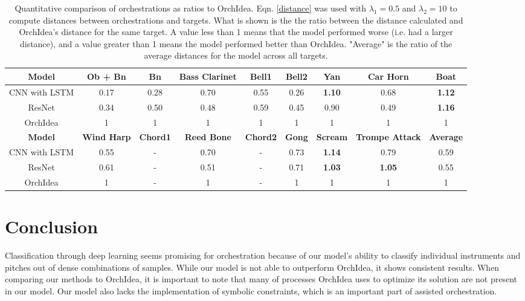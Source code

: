 \documentclass{article}
\begin{document}
\begin{table}
  \begin{center}
    \label{orch_eval}
    \begin{tabular}{|c|c|c|c|c|c|c|c|c|} 
    	  \hline
      \textbf{Model} & \textbf{Ob + Bn} & \textbf{Bn} & \textbf{Bass Clarinet} & \textbf{Bell1} & \textbf{Bell2} & \textbf{Yan} & \textbf{Car Horn} & \textbf{Boat}  \\
      \hline
      CNN with LSTM & 0.17 & 0.28 & 0.70 & 0.55 & 0.26 & \textbf{1.10} & 0.68 & \textbf{1.12} \\
      \hline
      ResNet & 0.34 & 0.50 & 0.48 & 0.59 & 0.45 & 0.90 & 0.49 & \textbf{1.16} \\
      \hline
      OrchIdea & 1 & 1 & 1 & 1 & 1 & 1 & 1 & 1 \\
      \hline
      \hline
      \textbf{Model} & \textbf{Wind Harp} & \textbf{Chord1} & \textbf{Reed Bone} & \textbf{Chord2} & \textbf{Gong} & \textbf{Scream} & \textbf{Trompe Attack} & \textbf{Average}  \\
      \hline
      CNN with LSTM & 0.55 & - & 0.70 & - & 0.73 & \textbf{1.14} & 0.79 & 0.59\\
      \hline
      ResNet & 0.61 & - & 0.51 & - & 0.71 & \textbf{1.03} & \textbf{1.05} & 0.55 \\
      \hline
      OrchIdea & 1 & - & 1 & - & 1 & 1 & 1 & 1 \\
      \hline
    \end{tabular}
  \end{center}
  \caption{Quantitative comparison of orchestrations as ratios to OrchIdea. Eqn. \eqref{distance} was used with $\lambda_1 = 0.5$ and $\lambda_2 = 10$ to compute distances between orchestrations and targets. What is shown is the the ratio between the distance calculated and OrchIdea's distance for the same target. A value less than 1 means that the model performed worse (i.e. had a larger distance), and a value greater than 1 means the model performed better than OrchIdea. "Average" is the ratio of the average distances for the model across all targets.}
\end{table}


\section{Conclusion}

Classification through deep learning seems promising for orchestration because of our model's ability to classify individual instruments and pitches out of dense combinations of samples. While our model is not able to outperform OrchIdea, it shows consistent results. When comparing our methods to OrchIdea, it is important to note that many of processes OrchIdea uses to optimize its solution are not present in our model. Our model also lacks the implementation of symbolic constraints, which is an important part of assisted orchestration.
\end{document}

